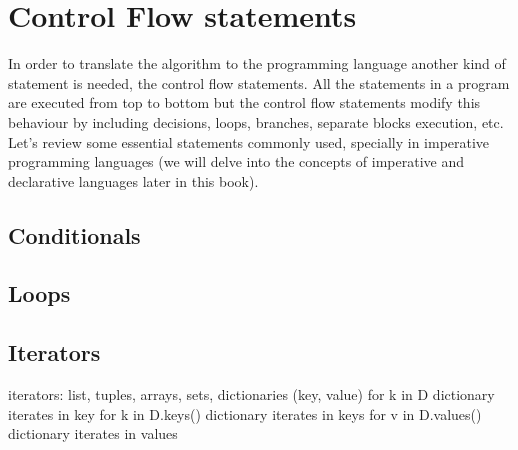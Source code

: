     \section{Control Flow statements}
In order to translate the algorithm to the programming language another kind of statement is needed, 
the control flow statements. 
All the statements in a program are executed from top to bottom but 
the control flow statements modify this behaviour by including decisions, 
loops, branches, separate blocks execution, etc. 
Let's review some essential statements commonly used, 
specially in imperative programming languages 
(we will delve into the concepts of imperative and declarative languages later in this book).


        \subsection*{Conditionals}
        
        
        
        \subsection*{Loops}
        
        
        
        \subsection*{Iterators}
        
        iterators: list, tuples, arrays, sets, dictionaries (key, value)
        for k in D   dictionary iterates in key 
        for k in D.keys()   dictionary iterates in keys
        for v in D.values()   dictionary iterates in values
        
    
    
    
    
        


    \newpage 
